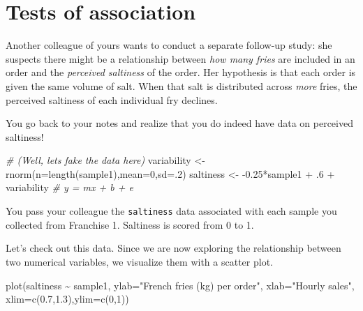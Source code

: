 \documentclass[
]{book}
\newenvironment{Shaded}{\begin{snugshade}}{\end{snugshade}}
\newcommand{\AttributeTok}[1]{\textcolor[rgb]{0.77,0.63,0.00}{#1}}
\newcommand{\CommentTok}[1]{\textcolor[rgb]{0.56,0.35,0.01}{\textit{#1}}}
\newcommand{\DecValTok}[1]{\textcolor[rgb]{0.00,0.00,0.81}{#1}}
\newcommand{\FloatTok}[1]{\textcolor[rgb]{0.00,0.00,0.81}{#1}}
\newcommand{\FunctionTok}[1]{\textcolor[rgb]{0.00,0.00,0.00}{#1}}
\newcommand{\NormalTok}[1]{#1}
\newcommand{\OtherTok}[1]{\textcolor[rgb]{0.56,0.35,0.01}{#1}}
\newcommand{\SpecialCharTok}[1]{\textcolor[rgb]{0.00,0.00,0.00}{#1}}
\newcommand{\StringTok}[1]{\textcolor[rgb]{0.31,0.60,0.02}{#1}}
\begin{document}
\hypertarget{tests-of-association}{%
\section*{Tests of association}\label{tests-of-association}}

Another colleague of yours wants to conduct a separate follow-up study: she suspects there might be a relationship between \emph{how many fries} are included in an order and the \emph{perceived saltiness} of the order. Her hypothesis is that each order is given the same volume of salt. When that salt is distributed across \emph{more} fries, the perceived saltiness of each individual fry declines.

You go back to your notes and realize that you do indeed have data on perceived saltiness!

\begin{Shaded}
\begin{Highlighting}[]
\CommentTok{\# (Well, let\textquotesingle{}s fake the data here)}
\NormalTok{variability }\OtherTok{\textless{}{-}} \FunctionTok{rnorm}\NormalTok{(}\AttributeTok{n=}\FunctionTok{length}\NormalTok{(sample1),}\AttributeTok{mean=}\DecValTok{0}\NormalTok{,}\AttributeTok{sd=}\NormalTok{.}\DecValTok{2}\NormalTok{)}
\NormalTok{saltiness }\OtherTok{\textless{}{-}} \SpecialCharTok{{-}}\FloatTok{0.25}\SpecialCharTok{*}\NormalTok{sample1 }\SpecialCharTok{+}\NormalTok{ .}\DecValTok{6} \SpecialCharTok{+}\NormalTok{ variability }\CommentTok{\# y = mx + b + e}
\end{Highlighting}
\end{Shaded}

You pass your colleague the \texttt{saltiness} data associated with each sample you collected from Franchise 1. Saltiness is scored from 0 to 1.

Let's check out this data. Since we are now exploring the relationship between two numerical variables, we visualize them with a scatter plot.

\begin{Shaded}
\begin{Highlighting}[]
\FunctionTok{plot}\NormalTok{(saltiness }\SpecialCharTok{\textasciitilde{}}\NormalTok{ sample1,}
     \AttributeTok{ylab=}\StringTok{"French fries (kg) per order"}\NormalTok{,}
     \AttributeTok{xlab=}\StringTok{"Hourly sales"}\NormalTok{,}
     \AttributeTok{xlim=}\FunctionTok{c}\NormalTok{(}\FloatTok{0.7}\NormalTok{,}\FloatTok{1.3}\NormalTok{),}\AttributeTok{ylim=}\FunctionTok{c}\NormalTok{(}\DecValTok{0}\NormalTok{,}\DecValTok{1}\NormalTok{))}
\end{Highlighting}
\end{Shaded}
\end{document}

